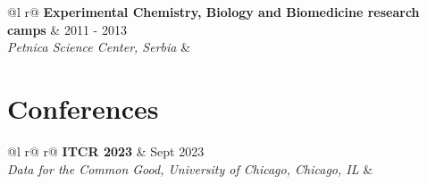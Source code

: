 \documentclass[a4paper,12pt]{article}
\begin{document}
\begin{tabularx}{\linewidth}{ @{}l r@{} }
\textbf{Experimental Chemistry, Biology and Biomedicine research camps} & \hfill 2011 - 2013 \\
\textit{Petnica Science Center, Serbia} & \\[3.75pt]
\end{tabularx}



\section{Conferences}
\begin{tabularx}{\linewidth}{ @{}l r@{} r@{} }
\textbf{ITCR 2023} & \hfill Sept 2023 \\
\textit{Data for the Common Good, University of Chicago, Chicago, IL} & \\[3.75pt]
\end{tabularx}
\end{document}
